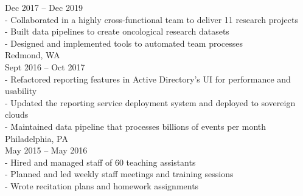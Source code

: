 \documentclass{resume} %
\begin{document}
\hspace*{1mm}{\em Software Engineer, Real World Evidence } \hfill Dec 2017 -- Dec 2019 \\
\hspace*{3mm}- Collaborated in a highly cross-functional team to deliver 11 research projects \\
\hspace*{3mm}- Built data pipelines to create oncological research datasets \\
\hspace*{3mm}- Designed and implemented tools to automated team processes \\


\hspace*{1mm}{\bf Microsoft } \hfill Redmond, WA \\
\hspace*{1mm}{\em Software Engineer, Azure Active Directory} \hfill Sept 2016 -- Oct 2017 \\
\hspace*{3mm}- Refactored reporting features in Active Directory’s UI for performance and usability \\
\hspace*{3mm}- Updated the reporting service deployment system and deployed to sovereign clouds \\
\hspace*{3mm}- Maintained data pipeline that processes billions of events per month \\


\hspace*{1mm}{\bf Computer and Information Science Department, University of Pennsylvania } \hfill Philadelphia, PA \\
\hspace*{1mm}{\em Head Teaching Assistant, Introduction to Computer Programming } \hfill May 2015 -- May 2016\\
\hspace*{3mm}- Hired and managed staff of 60 teaching assistants \\
\hspace*{3mm}- Planned and led weekly staff meetings and training sessions \\
\hspace*{3mm}- Wrote recitation plans and homework assignments
\end{document}
